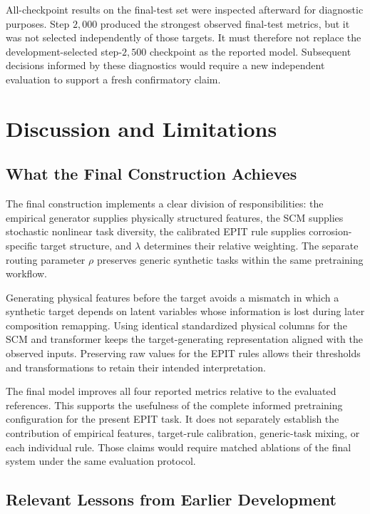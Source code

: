 \documentclass{article}
\begin{document}
All-checkpoint results on the final-test set were inspected afterward for
diagnostic purposes. Step \(2{,}000\) produced the strongest observed
final-test metrics, but it was not selected independently of those targets.
It must therefore not replace the development-selected step-\(2{,}500\)
checkpoint as the reported model. Subsequent decisions informed by these
diagnostics would require a new independent evaluation to support a fresh
confirmatory claim.

\section{Discussion and Limitations}
\label{sec:discussion}

\subsection{What the Final Construction Achieves}

The final construction implements a clear division of responsibilities: the
empirical generator supplies physically structured features, the SCM supplies
stochastic nonlinear task diversity, the calibrated EPIT rule supplies
corrosion-specific target structure, and \(\lambda\) determines their
relative weighting. The separate routing parameter \(\rho\) preserves
generic synthetic tasks within the same pretraining workflow.

Generating physical features before the target avoids a mismatch in which a
synthetic target depends on latent variables whose information is lost during
later composition remapping. Using identical standardized physical columns
for the SCM and transformer keeps the target-generating representation aligned
with the observed inputs. Preserving raw values for the EPIT rules allows
their thresholds and transformations to retain their intended interpretation.

The final model improves all four reported metrics relative to the evaluated
references. This supports the usefulness of the complete informed
pretraining configuration for the present EPIT task. It does not separately
establish the contribution of empirical features, target-rule calibration,
generic-task mixing, or each individual rule. Those claims would require
matched ablations of the final system under the same evaluation protocol.

\subsection{Relevant Lessons from Earlier Development}
\end{document}
